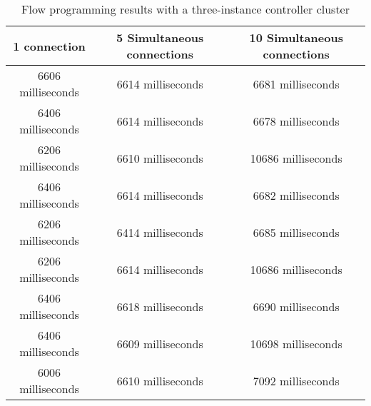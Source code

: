 \begin{table}[h!]
	\begin{center}
		\begin{tabular}{ | c | c | c | }
			\rowcolor{HeaderRowColor}
			\hline
			\textbf{1 connection} & \textbf{5 Simultaneous connections} & \textbf{10 Simultaneous connections}\\
			\hline
			6606 milliseconds & 6614 milliseconds & 6681 milliseconds \\
			\hline
			6406 milliseconds & 6614 milliseconds & 6678 milliseconds \\
			\hline
			6206 milliseconds & 6610 milliseconds & 10686 milliseconds \\
			\hline
			6406 milliseconds & 6614 milliseconds & 6682 milliseconds \\
			\hline
			6206 milliseconds & 6414 milliseconds & 6685 milliseconds \\
			\hline
			6206 milliseconds & 6614 milliseconds & 10686 milliseconds \\
			\hline
			6406 milliseconds & 6618 milliseconds & 6690 milliseconds \\
			\hline
			6406 milliseconds & 6609 milliseconds & 10698 milliseconds \\
			\hline
			6006 milliseconds & 6610 milliseconds & 7092 milliseconds \\
			\hline
		\end{tabular}
		\caption{Flow programming results with a three-instance controller cluster}
		\label{table:perfomance-tests-3controllers}
	\end{center}
\end{table}
%
